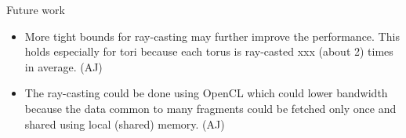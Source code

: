 Future work
\begin{itemize}
  \item More tight bounds for ray-casting may further improve the performance. This holds especially for tori because each torus is ray-casted xxx (about 2) times in average. (AJ)
  \item The ray-casting could be done using OpenCL which could lower bandwidth because the data common to many fragments could be fetched only once and shared using local (shared) memory. (AJ)
\end{itemize}